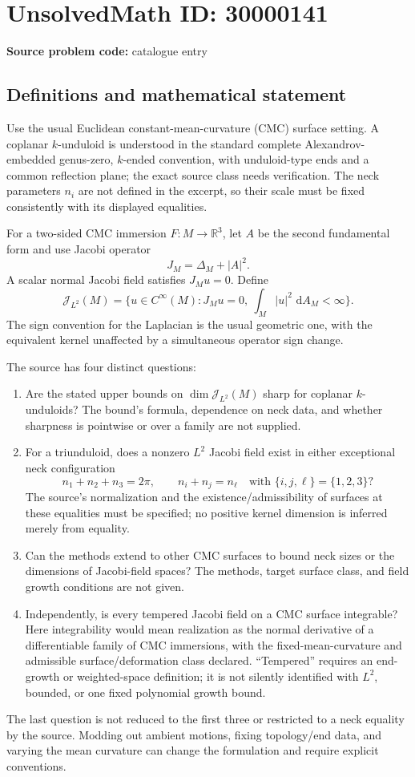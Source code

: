 \documentclass[11pt]{article}
\newcommand{\R}{\mathbb{R}}
\newcommand{\dd}{\,\mathrm{d}}
\begin{document}
\section*{UnsolvedMath ID: 30000141}
\textbf{Source problem code:} catalogue entry
\subsection{Definitions and mathematical statement}
Use the usual Euclidean constant-mean-curvature (CMC) surface setting. A coplanar \(k\)-unduloid is understood in the standard complete Alexandrov-embedded genus-zero, \(k\)-ended convention, with unduloid-type ends and a common reflection plane; the exact source class needs verification. The neck parameters \(n_i\) are not defined in the excerpt, so their scale must be fixed consistently with its displayed equalities.

For a two-sided CMC immersion \(F:M\to\R^3\), let \(A\) be the second fundamental form and use Jacobi operator
\[
 J_M=\Delta_M+|A|^2.
\]
A scalar normal Jacobi field satisfies \(J_Mu=0\). Define
\[
 \mathcal J_{L^2}(M)=\{u\in C^\infty(M):J_Mu=0,\ \int_M|u|^2\,\dd A_M<\infty\}.
\]
The sign convention for the Laplacian is the usual geometric one, with the equivalent kernel unaffected by a simultaneous operator sign change.

The source has four distinct questions:
\begin{enumerate}
\item Are the stated upper bounds on \(\dim\mathcal J_{L^2}(M)\) sharp for coplanar \(k\)-unduloids? The bound's formula, dependence on neck data, and whether sharpness is pointwise or over a family are not supplied.
\item For a triunduloid, does a nonzero \(L^2\) Jacobi field exist in either exceptional neck configuration
\[
 n_1+n_2+n_3=2\pi,
 \qquad n_i+n_j=n_\ell\quad\text{with }\{i,j,\ell\}=\{1,2,3\}?
\]
The source's normalization and the existence/admissibility of surfaces at these equalities must be specified; no positive kernel dimension is inferred merely from equality.
\item Can the methods extend to other CMC surfaces to bound neck sizes or the dimensions of Jacobi-field spaces? The methods, target surface class, and field growth conditions are not given.
\item Independently, is every tempered Jacobi field on a CMC surface integrable? Here integrability would mean realization as the normal derivative of a differentiable family of CMC immersions, with the fixed-mean-curvature and admissible surface/deformation class declared. ``Tempered'' requires an end-growth or weighted-space definition; it is not silently identified with \(L^2\), bounded, or one fixed polynomial growth bound.
\end{enumerate}
The last question is not reduced to the first three or restricted to a neck equality by the source. Modding out ambient motions, fixing topology/end data, and varying the mean curvature can change the formulation and require explicit conventions.
\end{document}
